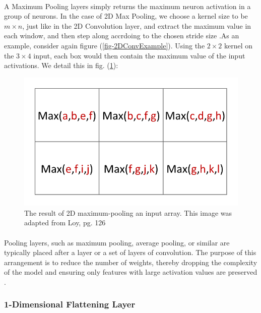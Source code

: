 \documentclass[12pt,letterpaper]{article}
\begin{document}
\paragraph*{}A Maximum Pooling layers simply returns the maximum neuron activation in a group of neurons. In the case of 2D Max Pooling, we choose a kernel size to be $m \times n$, just like in the 2D Convolution layer, and extract the maximum value in each window, and then step along accrdoing to the chosen stride size \cite{Loy,Goodfellow}.As an example, consider again figure (\ref{fig-2DConvExample}). Using the $2 \times 2$ kernel on the $3 \times 4$ input, each box would then contain the maximum value of the input activations. We detail this in fig. (\ref{fig-2DMaxPool}):
\begin{figure}[h]
\label{fig-2DMaxPool}
\begin{center}
\includegraphics[scale=0.6]{../figures/2DConvExample(d)}
\end{center}
\caption{The result of 2D maximum-pooling an input array. This image was adapted from Loy, pg. 126 \cite{Loy}}
\end{figure} 

\paragraph*{}Pooling layers, such as maximum pooling, average pooling, or similar are typically placed after a layer or a set of layers of convolution. The purpose of this arrangement is to reduce the number of weights, thereby dropping the complexity of the model and ensuring only features with large activation values are preserved \cite{Geron,Loy,Goodfellow}.


\subsubsection{1-Dimensional Flattening Layer}
\end{document}
